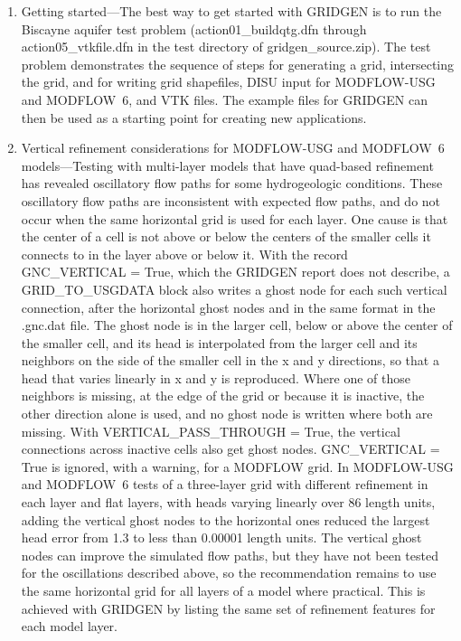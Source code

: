 \documentclass[11pt,twoside,twocolumn]{usgsreport}
\begin{document}
\begin{enumerate}
  \item Getting started---The best way to get started with GRIDGEN is to run the Biscayne aquifer test problem (action01\_buildqtg.dfn through action05\_vtkfile.dfn in the test directory of gridgen\_source.zip). The test problem demonstrates the sequence of steps for generating a grid, intersecting the grid, and for writing grid shapefiles, DISU input for MODFLOW-USG and MODFLOW~6, and VTK files. The example files for GRIDGEN can then be used as a starting point for creating new applications.
  \item Vertical refinement considerations for MODFLOW-USG and MODFLOW~6 models---Testing with multi-layer models that have quad-based refinement has revealed oscillatory flow paths for some hydrogeologic conditions. These oscillatory flow paths are inconsistent with expected flow paths, and do not occur when the same horizontal grid is used for each layer. One cause is that the center of a cell is not above or below the centers of the smaller cells it connects to in the layer above or below it. With the record GNC\_VERTICAL = True, which the GRIDGEN report does not describe, a GRID\_TO\_USGDATA block also writes a ghost node for each such vertical connection, after the horizontal ghost nodes and in the same format in the .gnc.dat file. The ghost node is in the larger cell, below or above the center of the smaller cell, and its head is interpolated from the larger cell and its neighbors on the side of the smaller cell in the x and y directions, so that a head that varies linearly in x and y is reproduced. Where one of those neighbors is missing, at the edge of the grid or because it is inactive, the other direction alone is used, and no ghost node is written where both are missing. With VERTICAL\_PASS\_THROUGH = True, the vertical connections across inactive cells also get ghost nodes. GNC\_VERTICAL = True is ignored, with a warning, for a MODFLOW grid. In MODFLOW-USG and MODFLOW~6 tests of a three-layer grid with different refinement in each layer and flat layers, with heads varying linearly over 86 length units, adding the vertical ghost nodes to the horizontal ones reduced the largest head error from 1.3 to less than 0.00001 length units. The vertical ghost nodes can improve the simulated flow paths, but they have not been tested for the oscillations described above, so the recommendation remains to use the same horizontal grid for all layers of a model where practical. This is achieved with GRIDGEN by listing the same set of refinement features for each model layer.

\end{enumerate}
\end{document}
